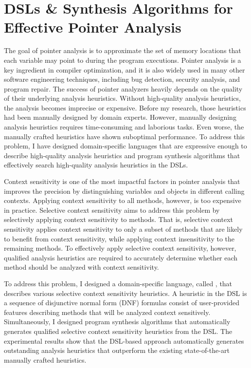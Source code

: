 \documentclass[11pt]{article}
\newcommand{\myparagraph}[1]{\medskip\noindent{\it \textbf{#1.}}}
\begin{document}
\section{DSLs \& Synthesis Algorithms for Effective Pointer Analysis}
%
The goal of pointer analysis is to approximate the set of memory locations that each variable may point to during the program executions.
%
Pointer analysis is a key ingredient in compiler optimization, and it is also widely used in many other software engineering techniques, including bug detection, security analysis, and program repair.
%
The success of pointer analyzers heavily depends on the quality of their underlying analysis heuristics.
%
Without high-quality analysis heuristics, the analysis becomes imprecise or expensive.
%
Before my research, those heuristics had been manually designed by domain experts. 
%
However, manually designing analysis heuristics requires time-consuming and laborious tasks.
%
Even worse, the manually crafted heuristics have shown suboptimal performance.
%
To address this problem, I have designed domain-specific languages that are expressive enough to describe high-quality analysis heuristics and program synthesis algorithms that effectively search  high-quality analysis heuristics in the DSLs.



\myparagraph{Disjunctive Model $\&$ Synthesis Algorithms~\cite{JeJeChOh17,Jeon2019,IST2021}}
%
Context sensitivity is one of the most impactful factors in pointer analysis that improves the precision by distinguishing variables and objects in different calling contexts.
%
Applying context sensitivity to all methods, however, is too expensive in practice.
%
Selective context sensitivity aims to address this problem by selectively applying context sensitivity to methods.
%
That is, selective context sensitivity applies context sensitivity to only a subset of methods that are likely to benefit from context sensitivity, while applying context insensitivity to the remaining methods.
%
To effectively apply selective context sensitivity, however, qualified analysis heuristics are required to accurately determine whether each method should be analyzed with context sensitivity.




To address this problem, I designed a domain-specific language, called \DisjunctiveModel, that describes various selective context sensitivity heuristics.
%
A heuristic in the DSL is a sequence of disjunctive normal form (DNF) formulas consist of user-provided features describing methods that will be analyzed context sensitively.
%
Simultaneously, I designed program synthesis algorithms that automatically generates qualified selective context sensitivity heuristics from the DSL.
%
The experimental results show that the DSL-based approach automatically generates outstanding analysis heuristics that outperform the existing state-of-the-art manually crafted heuristics.
%
\end{document}
